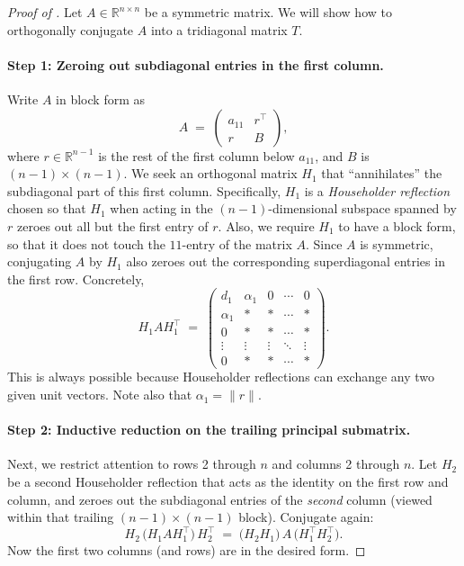 \documentclass[letterpaper,11pt,oneside,reqno]{article}
\numberwithin{equation}{section}
\theoremstyle{definition}
\begin{document}
\begin{proof}[Proof of ]
Let $A\in \mathbb{R}^{n\times n}$ be a symmetric matrix. We will show how to orthogonally conjugate $A$ into a tridiagonal matrix $T$.

\paragraph{Step 1: Zeroing out subdiagonal entries in the first column.}
Write $A$ in block form as
\[
  A \;=\;
  \begin{pmatrix}
    a_{11} & r^\top\\[3pt]
    r      & B
  \end{pmatrix},
\]
where $r\in \mathbb{R}^{n-1}$ is the rest of the first column below $a_{11}$, and $B$ is $(n-1)\times(n-1)$.  
We seek an orthogonal matrix $H_1$ that ``annihilates'' the subdiagonal part of this first column.  Specifically, $H_1$ is a \emph{Householder reflection} chosen so that
$H_1$ when acting in the $(n-1)$-dimensional subspace spanned by $r$ zeroes out all but the first entry of $r$. Also, we require $H_1$ to have a block form, so 
that it does not touch the $11$-entry of the matrix $A$.
Since $A$ is symmetric, conjugating $A$ by $H_1$ also zeroes out the corresponding superdiagonal entries in the first row.  Concretely,
\[
  H_1 A H_1^\top
  \;=\;
  \begin{pmatrix}
    d_1 & \alpha_1 & 0 & \cdots & 0\\
    \alpha_1 & * & * & \cdots & *\\
    0 & * & * & \cdots & *\\
    \vdots & \vdots & \vdots & \ddots & \vdots\\
    0 & * & * & \cdots & *
  \end{pmatrix}.
\]
This is always possible because Householder reflections can exchange any two given unit vectors.
Note also that $\alpha_1=\|r\|$.

\paragraph{Step 2: Inductive reduction on the trailing principal submatrix.}
Next, we restrict attention to rows 2 through $n$ and columns 2 through $n$.  Let $H_2$ be a second Householder reflection that acts as the identity on the first row and column, and zeroes out the subdiagonal entries of the \emph{second} column (viewed within that trailing $(n-1)\times (n-1)$ block).  Conjugate again:
\[
  H_2\,\bigl(H_1 A H_1^\top\bigr)\,H_2^\top
  \;=\;
  \bigl(H_2H_1\bigr)\,A\,\bigl(H_1^\top H_2^\top\bigr).
\]
Now the first two columns (and rows) are in the desired form.


\end{proof}
\end{document}
